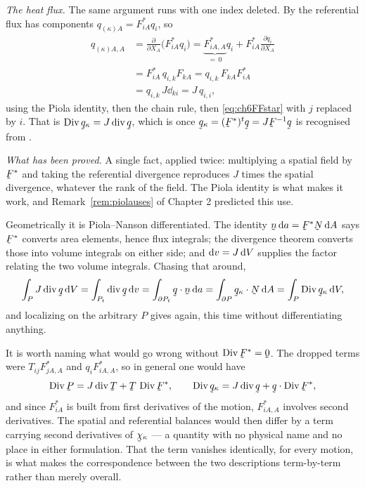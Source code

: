 \begin{solution}
\medskip
\noindent\emph{The heat flux.}
The same argument runs with one index deleted. By  the
referential flux has components $q_{(\kappa)A}=F^{*}_{iA}q_{i}$, so
\[
\begin{aligned}
   q_{(\kappa)A,A}
   &=\frac{\partial}{\partial X_{A}}\big(F^{*}_{iA}q_{i}\big)
    =\underbrace{F^{*}_{iA,A}}_{=\,0}q_{i}
     +F^{*}_{iA}\frac{\partial q_{i}}{\partial X_{A}}\\
   &=F^{*}_{iA}\,q_{i,k}F_{kA}
    =q_{i,k}\,F_{kA}F^{*}_{iA}\\
   &=q_{i,k}\,J\dd_{ki}
    =J\,q_{i,i} ,
\end{aligned}
\]
using the Piola identity, then the chain rule, then
\eqref{eq:ch6FFstar} with $j$ replaced by $i$. That is
$\Dvg\bq_{\kappa}=J\dvg\bq$, which is  once
$\bq_{\kappa}=(\bF^{*})^{t}\bq=J\bF^{-1}\bq$ is recognised from
.

\medskip
\noindent\emph{What has been proved.}
A single fact, applied twice: multiplying a spatial field by $\bF^{*}$
and taking the referential divergence reproduces $J$ times the spatial
divergence, whatever the rank of the field. The Piola identity is what
makes it work, and Remark~\ref{rem:piolauses} of Chapter 2 predicted
this use.

Geometrically it is Piola--Nanson differentiated. The identity
$\bn\,\dl a=\bF^{*}\bN\,\dl A$ says $\bF^{*}$ converts area elements,
hence flux integrals; the divergence theorem converts those into volume
integrals on either side; and $\mathrm{d} v=J\,\mathrm{d} V$ supplies the factor
relating the two volume integrals. Chasing that around,
\[
   \int_{P}J\dvg\bq\,\dl V=\int_{P_{t}}\dvg\bq\,\dl v
   =\int_{\partial P_{t}}\ip\bq\bn\,\dl a
   =\int_{\partial P}\ip{\bq_{\kappa}}\bN\,\dl A
   =\int_{P}\Dvg\bq_{\kappa}\,\dl V ,
\]
and localizing on the arbitrary $P$ gives  again, this time
without differentiating anything.

It is worth naming what would go wrong without $\Dvg\bF^{*}=\bze$. The
dropped terms were $T_{ij}F^{*}_{jA,A}$ and $q_{i}F^{*}_{iA,A}$, so in
general one would have
\[
   \Dvg\bP=J\dvg\bT+\bT\,\Dvg\bF^{*} ,
   \qquad
   \Dvg\bq_{\kappa}=J\dvg\bq+\ip{\bq}{\Dvg\bF^{*}} ,
\]
and since $F^{*}_{iA}$ is built from first derivatives of the motion,
$F^{*}_{iA,A}$ involves second derivatives. The spatial and referential
balances would then differ by a term carrying second derivatives of
$\bchi_{\kappa}$ --- a quantity with no physical name and no place in
either formulation. That the term vanishes identically, for every
motion, is what makes the correspondence between the two descriptions
term-by-term rather than merely overall.
\end{solution}

